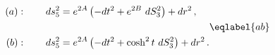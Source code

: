 \begin{equation}
\begin{split}
(a):\qquad ds_5^2&=e^{2 A} \left(-dt^2 +e^{2 B}\ dS_3^2\right)+dr^2\,,\\
\\
(b):\qquad ds_5^2&=e^{2 A} \left(-dt^2 +\cosh^2 t\  dS_3^2\right)+dr^2\,.
\end{split}
\eqlabel{ab}
\end{equation}

